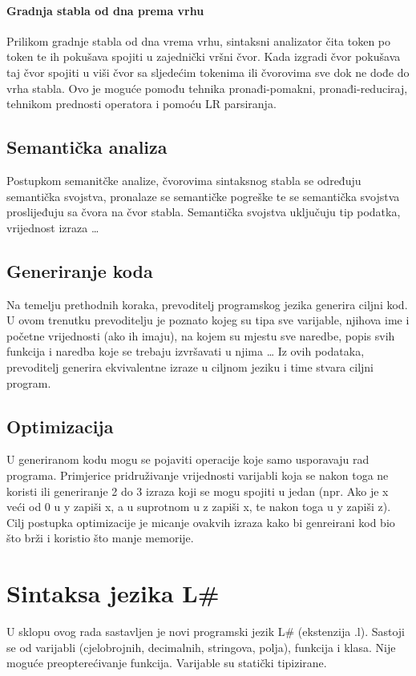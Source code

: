 \documentclass[times, utf8, zavrsni]{fer}
\begin{document}
\subsubsection{Gradnja stabla od dna prema vrhu}
Prilikom gradnje stabla od dna vrema vrhu, sintaksni analizator čita token po token te ih pokušava spojiti u zajednički vršni čvor.
Kada izgradi čvor pokušava taj čvor spojiti u viši čvor sa sljedećim tokenima ili čvorovima sve dok ne dođe do vrha stabla.
Ovo je moguće pomođu tehnika pronađi-pomakni, pronađi-reduciraj, tehnikom prednosti operatora i pomoću LR parsiranja. \cite{ppj}

\section{Semantička analiza}
Postupkom semanitčke analize, čvorovima sintaksnog stabla se određuju semantička svojstva, pronalaze se semantičke pogreške
te se semantička svojstva proslijeđuju sa čvora na čvor stabla. Semantička svojstva uključuju tip podatka, vrijednost izraza \dots \cite{ppj}

\section{Generiranje koda}
Na temelju prethodnih koraka, prevoditelj programskog jezika generira ciljni kod. U ovom trenutku prevoditelju je poznato
kojeg su tipa sve varijable, njihova ime i početne vrijednosti (ako ih imaju), na kojem su mjestu sve naredbe, popis svih funkcija i naredba koje se trebaju izvršavati u njima \dots
Iz ovih podataka, prevoditelj generira ekvivalentne izraze u ciljnom jeziku i time stvara ciljni program. \cite{ppj}

\section{Optimizacija}
U generiranom kodu mogu se pojaviti operacije koje samo usporavaju rad programa. Primjerice pridruživanje vrijednosti varijabli koja se nakon toga ne koristi
ili generiranje 2 do 3 izraza koji se mogu spojiti u jedan (npr. Ako je x veći od 0 u y zapiši x, a u suprotnom u z zapiši x, te nakon toga u y zapiši z).
Cilj postupka optimizacije je micanje ovakvih izraza kako bi genreirani kod bio što brži i koristio što manje memorije.

\chapter{Sintaksa jezika L\# }
U sklopu ovog rada sastavljen je novi programski jezik L\# (ekstenzija .l). Sastoji se od varijabli (cjelobrojnih, decimalnih, stringova, polja), 
funkcija i klasa. Nije moguće preopterećivanje funkcija. Varijable su statički tipizirane.
\end{document}
